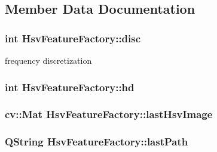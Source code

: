 \subsection{Member Data Documentation}
\hypertarget{class_hsv_feature_factory_a6bd57065b760e5ef23c555e354c79ae6}{
\subsubsection[{disc}]{\setlength{\rightskip}{0pt plus 5cm}int Hsv\+Feature\+Factory\+::disc\hspace{0.3cm}{\ttfamily [private]}}}\label{class_hsv_feature_factory_a6bd57065b760e5ef23c555e354c79ae6}
frequency discretization \hypertarget{class_hsv_feature_factory_aa6c7f3bd586b6bbe1b0ae404c0220f99}{
\subsubsection[{hd}]{\setlength{\rightskip}{0pt plus 5cm}int Hsv\+Feature\+Factory\+::hd\hspace{0.3cm}{\ttfamily [private]}}}\label{class_hsv_feature_factory_aa6c7f3bd586b6bbe1b0ae404c0220f99}
\hypertarget{class_hsv_feature_factory_ad9a0b2d197a4ad50c61cdcb8d699112d}{
\subsubsection[{last\+Hsv\+Image}]{\setlength{\rightskip}{0pt plus 5cm}cv\+::\+Mat Hsv\+Feature\+Factory\+::last\+Hsv\+Image\hspace{0.3cm}{\ttfamily [private]}}}\label{class_hsv_feature_factory_ad9a0b2d197a4ad50c61cdcb8d699112d}
\hypertarget{class_hsv_feature_factory_a1adf2c7f44d994073e6a0f41aa67d4ef}{
\subsubsection[{last\+Path}]{\setlength{\rightskip}{0pt plus 5cm}Q\+String Hsv\+Feature\+Factory\+::last\+Path\hspace{0.3cm}{\ttfamily [private]}}}\label{class_hsv_feature_factory_a1adf2c7f44d994073e6a0f41aa67d4ef}
